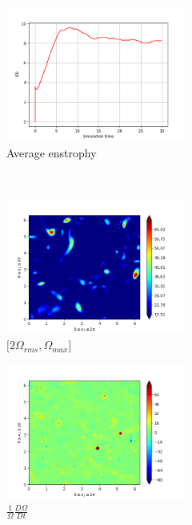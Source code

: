 \begin{figure}[H]
    \begin{subfigure}[H]{0.45\textwidth}
        \includegraphics[height=1.75in]{media/run-cds-65/enst-average1340.png}
        \caption{Average enstrophy}
    \end{subfigure}
    ~
    \begin{subfigure}[H]{0.45\textwidth}
        \includegraphics[height=1.75in]{media/run-cds-65/enst-2-1340.png}
        \caption{$[2\Omega_{rms}, \Omega_{max} $] }
    \end{subfigure}
    \newline
    \begin{subfigure}[H]{0.45\textwidth}
        \includegraphics[height=1.75in]{media/run-cds-65/enst-1340.png}
        \caption{$\frac{1}{\Omega} \frac{D \Omega}{Dt}$}
    \end{subfigure}
    ~
    \begin{subfigure}{0.45\textwidth}

\end{subfigure}
\end{figure}
